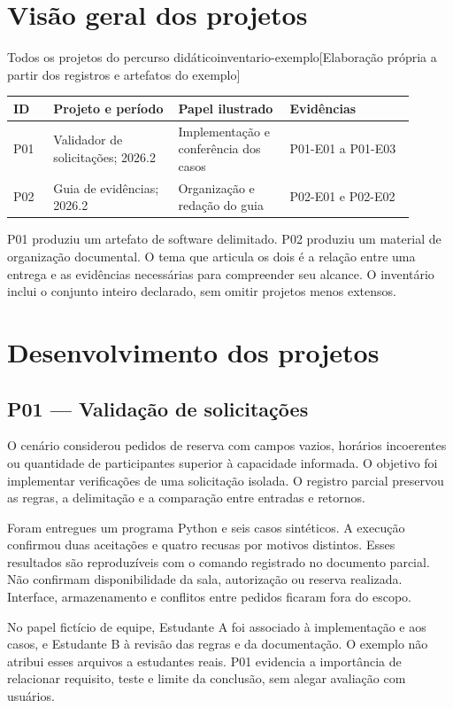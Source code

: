 \chapter{Visão geral dos projetos}
\begin{undftabela}[H]{Todos os projetos do percurso didático}{inventario-exemplo}[Elaboração própria a partir dos registros e artefatos do exemplo]
\begin{tabular}{@{}p{0.09\linewidth}p{0.28\linewidth}p{0.25\linewidth}p{0.28\linewidth}@{}}
\hline
\textbf{ID} & \textbf{Projeto e período} & \textbf{Papel ilustrado} & \textbf{Evidências} \\
\hline
P01 & Validador de solicitações; 2026.2 & Implementação e conferência dos casos & P01-E01 a P01-E03 \\
P02 & Guia de evidências; 2026.2 & Organização e redação do guia & P02-E01 e P02-E02 \\
\hline
\end{tabular}
\end{undftabela}
P01 produziu um artefato de software delimitado. P02 produziu um material de
organização documental. O tema que articula os dois é a relação entre uma
entrega e as evidências necessárias para compreender seu alcance. O inventário
inclui o conjunto inteiro declarado, sem omitir projetos menos extensos.

\chapter{Desenvolvimento dos projetos}
\section{P01 --- Validação de solicitações}
O cenário considerou pedidos de reserva com campos vazios, horários incoerentes
ou quantidade de participantes superior à capacidade informada. O objetivo
foi implementar verificações de uma solicitação isolada. O registro parcial
preservou as regras, a delimitação e a comparação entre entradas e retornos.

Foram entregues um programa Python e seis casos sintéticos. A execução
confirmou duas aceitações e quatro recusas por motivos distintos. Esses
resultados são reproduzíveis com o comando registrado no documento parcial.
Não confirmam disponibilidade da sala, autorização ou reserva realizada.
Interface, armazenamento e conflitos entre pedidos ficaram fora do escopo.

No papel fictício de equipe, Estudante A foi associado à implementação e aos
casos, e Estudante B à revisão das regras e da documentação. O exemplo não
atribui esses arquivos a estudantes reais. P01 evidencia a importância de
relacionar requisito, teste e limite da conclusão, sem alegar avaliação com usuários.

